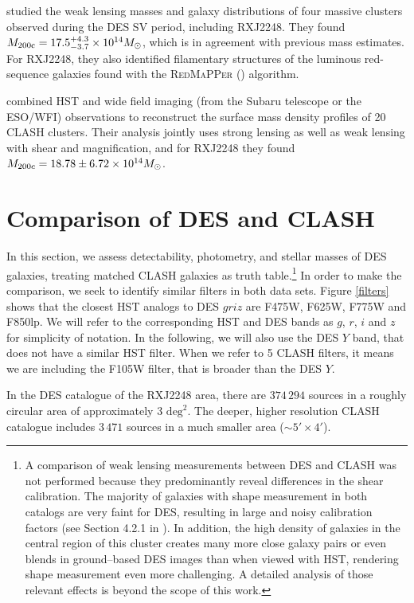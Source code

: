 {\citet{melchior} studied the weak lensing masses and galaxy distributions of four massive clusters observed during the DES SV period, including RXJ2248. They found $M_{200\mathrm{c}}=17.5^{+4.3}_{-3.7}\times 10^{14} \mbox{$M_{\odot}$}$, which is in agreement with previous mass estimates. For RXJ2248, they also identified filamentary structures of the luminous red-sequence galaxies found with the \textsc{RedMaPPer} (\citealt{redpaper}) algorithm. 

\citet{umetsu15} combined HST and wide field imaging (from the Subaru telescope or the ESO/WFI) observations to reconstruct the surface mass density profiles of 20 CLASH clusters. Their analysis jointly uses strong lensing as well as weak lensing with shear and magnification, and for RXJ2248 they found $M_{200c}=18.78 \pm 6.72 \times 10^{14}\mbox{$M_{\odot}$}$.

\section{Comparison of DES and CLASH}\label{comparison}
In this section, we assess detectability, photometry, and stellar masses of DES galaxies, treating matched CLASH galaxies as truth table.\footnote{A comparison of weak lensing measurements between DES and CLASH was not performed because they predominantly reveal differences in the shear calibration. The majority of galaxies with shape measurement in both catalogs are very faint for DES, resulting in large and noisy calibration factors (see Section 4.2.1 in \citealt{melchior}). In addition, the high density of galaxies in the central region of this cluster creates many more close galaxy pairs or even blends in ground--based DES images than when viewed with HST, rendering shape measurement even more challenging. A detailed analysis of those relevant effects is beyond the scope of this work.} In order to make the comparison, we seek to identify similar filters in both data sets. Figure \ref{filters} shows that the closest HST analogs to DES $griz$ are F475W, F625W, F775W and F850lp. We will refer to the corresponding HST and DES bands as $g$, $r$, $i$ and $z$ for simplicity of notation. In the following, we will also use the DES $Y$ band, that does not have a similar HST filter. When we refer to 5 CLASH filters, it means we are including the F105W filter, that is broader than the DES $Y$. 

In the DES catalogue of the RXJ2248 area, there are $374\,294$ sources in a roughly circular area of approximately 3 $\mathrm{deg}^2$. 
The deeper, higher resolution CLASH catalogue includes $3\,471$ sources in a much smaller area ($\sim 5'\times 4'$).

}

